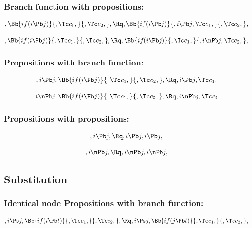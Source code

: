 \bigskip
\bigskip
\bigskip
\bigskip
\subsubsection{Branch function with propositions:}
\[, \Bb{if(i \Pb j)}{,\Tc c_1,}{,\Tc c_2,}, \Rq , \Bb{if(i \Pb j)}{,i \Pb j,\Tc c_1,}{,\Tc c_2,},\]

\[, \Bb{if(i \Pb j)}{,\Tc c_1,}{,\Tc c_2,}, \Rq , \Bb{if(i \Pb j)}{,\Tc c_1,}{,i \nPb j,\Tc c_2,},\]

\bigskip
\bigskip
\bigskip
\bigskip
\subsubsection{Propositions with branch function:}
\[,i \Pb j, \Bb{if(i \Pb j)}{,\Tc c_1,}{,\Tc c_2,}, \Rq , i \Pb j, \Tc c_1,\]

\[,i \nPb j, \Bb{if(i \Pb j)}{,\Tc c_1,}{,\Tc c_2,}, \Rq , i \nPb j, \Tc c_2,\]


\bigskip
\bigskip
\bigskip
\bigskip
\subsubsection{Propositions with propositions:}
\[,i \Pb j, \Rq , i \Pb j, i \Pb j,\]

\[,i \nPb j, \Rq , i \nPb j, i \nPb j,\]




\bigskip
\bigskip
\bigskip
\bigskip
\subsection{ Substitution}
\subsubsection{Identical node Propositions with branch function:}
\[,i \Ps j, \Bb{if(i \Pb t)}{,\Tc c_1,}{,\Tc c_2,}, \Rq ,i \Ps j, \Bb{if(j \Pb t)}{,\Tc c_1,}{,\Tc c_2,}, \]


